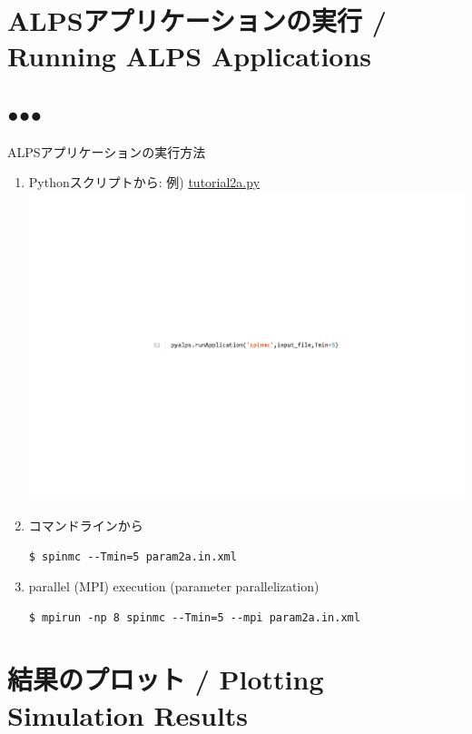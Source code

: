 \section{ALPSアプリケーションの実行 / Running ALPS Applications}
\subsection*{{\protect\color{red}●}{\protect\color{blue}●}{\protect\color{green}●}}

\begin{frame}[t,fragile]{ALPSアプリケーションの実行方法}
  \begin{enumerate}
  \item Pythonスクリプトから: 例) \href{https://github.com/cmsi/alps-tutorial/blob/tutorials/tutorials/mc-02-susceptibilities/tutorial2a.py}{tutorial2a.py}
    \includegraphics[height=.08\textheight]{tutorial2a-2.pdf}
  \item コマンドラインから
\begin{lstlisting}
$ spinmc --Tmin=5 param2a.in.xml
\end{lstlisting}
  \item parallel (MPI) execution (parameter parallelization)
\begin{lstlisting}
$ mpirun -np 8 spinmc --Tmin=5 --mpi param2a.in.xml
\end{lstlisting}
  \end{enumerate}
\end{frame}

\section{結果のプロット / Plotting Simulation Results}

